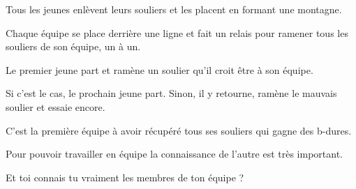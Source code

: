 \documentclass{grand-jeu}
\begin{document}
\begin{regles}
Tous les jeunes enlèvent leurs souliers et les placent en formant une montagne. 

Chaque équipe se place derrière une ligne et fait un relais pour ramener tous les souliers de son équipe, un à un.  

Le premier jeune part et ramène un soulier qu’il croit être à son équipe. 

Si c’est le cas, le prochain jeune part. Sinon, il y retourne, ramène le mauvais soulier et essaie encore.

C’est la première équipe à avoir récupéré tous ses souliers qui gagne des b-dures.
\end{regles}

\begin{imaginaire}
Pour pouvoir travailler en équipe la connaissance de l'autre est très important.

\vspace{0.2cm}
Et toi connais tu vraiment les membres de ton équipe ?
\end{imaginaire}

\begin{moments-stop}
\end{moments-stop}
\end{document}
